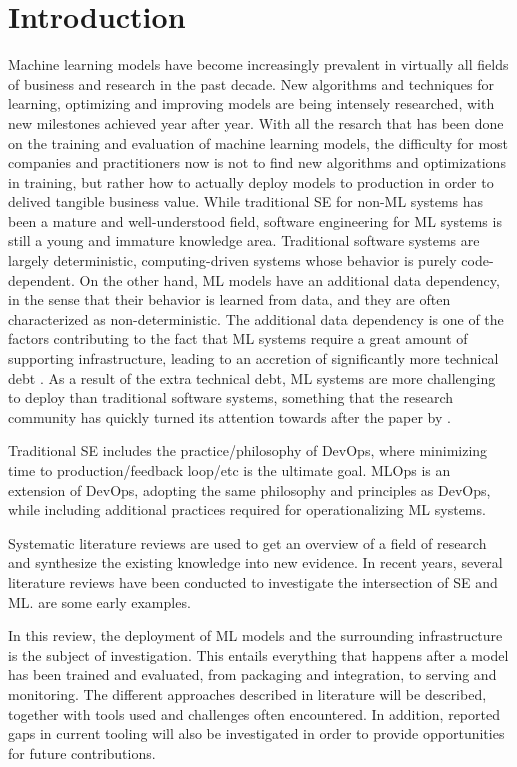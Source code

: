 \chapter{Introduction}
\label{ch:introduction}
Machine learning models have become increasingly prevalent in virtually all fields of business and research in the past decade.
New algorithms and techniques for learning, optimizing and improving models are being intensely researched, with new milestones achieved year after year.
With all the resarch that has been done on the training and evaluation of machine learning models, the difficulty for most companies and practitioners now is not to find new algorithms and optimizations in training, but rather how to actually deploy models to production in order to delived tangible business value.
While traditional SE for non-ML systems has been a mature and well-understood field, software engineering for ML systems is still a young and immature knowledge area.
Traditional software systems are largely deterministic, computing-driven systems whose behavior is purely code-dependent.
On the other hand, ML models have an additional data dependency, in the sense that their behavior is learned from data, and they are often characterized as non-deterministic.
The additional data dependency is one of the factors contributing to the fact that ML systems require a great amount of supporting infrastructure, leading to an accretion of significantly more technical debt \cite{Sculley2015}.
As a result of the extra technical debt, ML systems are more challenging to deploy than traditional software systems, something that the research community has quickly turned its attention towards after the paper by \cite{Sculley2015}.

Traditional SE includes the practice/philosophy of DevOps, where minimizing time to production/feedback loop/etc is the ultimate goal.
MLOps is an extension of DevOps, adopting the same philosophy and principles as DevOps, while including additional practices required for operationalizing ML systems.

Systematic literature reviews are used to get an overview of a field of research and synthesize the existing knowledge into new evidence.
In recent years, several literature reviews have been conducted to investigate the intersection of SE and ML.
\cite{Baier2019, Kumeno2020} are some early examples.

In this review, the deployment of ML models and the surrounding infrastructure is the subject of investigation.
This entails everything that happens after a model has been trained and evaluated, from packaging and integration, to serving and monitoring.
The different approaches described in literature will be described, together with tools used and challenges often encountered.
In addition, reported gaps in current tooling will also be investigated in order to provide opportunities for future contributions.

